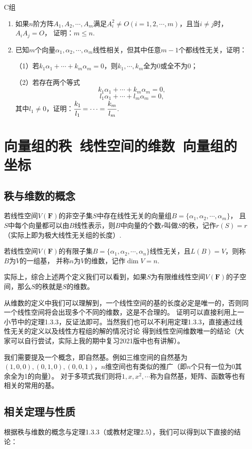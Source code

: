 \centerline{\heiti C组}
\begin{enumerate}
	\item 如果$n$阶方阵$A_1,A_2,\cdots,A_m$满足$A_i^2\neq O(i=1,2,\cdots,m)$，且当$i\neq j$时，$A_iA_j=O$，
	证明：$m\le n$.
	\item 已知$m$个向量$\alpha_1,\alpha_2,\cdots,\alpha_m$线性相关，但其中任意$m-1$个都线性无关，证明：
	
	（1）若$k_1\alpha_1+\cdots+k_m\alpha_m=0$，则$k_1,\cdots,k_m$全为0或全不为0；

	（2）若存在两个等式
	$$k_1\alpha_1+\cdots+k_m\alpha_m=0,$$
	$$l_1\alpha_1+\cdots+l_m\alpha_m=0,$$
	其中$l_1\neq 0$，证明：$\cfrac{k_1}{l_1}=\cdots=\cfrac{k_m}{l_m}$.
\end{enumerate}

\section{向量组的秩\ 线性空间的维数\ 向量组的坐标}
\subsection{秩与维数的概念}
\begin{definition}
	若线性空间$V(\mathbf{F})$的非空子集$S$中存在线性无关的向量组$B=\{\alpha_1,\alpha_2,\cdots,\alpha_m\}$，
	且$S$中每个向量都可以由$B$线性表示，则$B$中向量的个数$r$叫做$S$的秩，记作$r(S)= r$（实际上即为极大线性无关组的长度）.
\end{definition}
\begin{definition}
	若线性空间$V(\mathbf{F})$的有限子集$B=\{\alpha_1,\alpha_2,\cdots,\alpha_n\}$线性无关，且$L(B) = V$，则称$B$为$V$的一组基，
	并称$n$为$V$的维数，记作$\dim V = n$.
\end{definition}
实际上，综合上述两个定义我们可以看到，如果$S$为有限维线性空间$V(\mathbf{F})$的子空间，那么$S$的秩就是$S$的维数。

从维数的定义中我们可以理解到，一个线性空间的基的长度必定是唯一的，否则同一个线性空间将会出现多个不同的维数，这是不合理的。
证明可以直接利用上一小节中的定理1.3.3，反证法即可。当然我们也可以不利用定理1.3.3，直接通过线性无关的定义以及线性方程组的解的情况讨论
得到线性空间维数唯一的结论（大家可以自行尝试，实际上我的期中复习2021版中也有讲解）。

我们需要提及一个概念，即自然基。例如三维空间的自然基为$(1,0,0),(0,1,0),(0,0,1)$，$n$维空间也有类似的推广（即$n$个只有一位为0其余全为1的向量）。
对于多项式我们则将$1,x,x^2,\cdots$称为自然基，矩阵、函数等也有相关的常用的基。
\subsection{相关定理与性质}
根据秩与维数的概念与定理1.3.3（或教材定理2.5），我们可以得到以下直接的结论：

